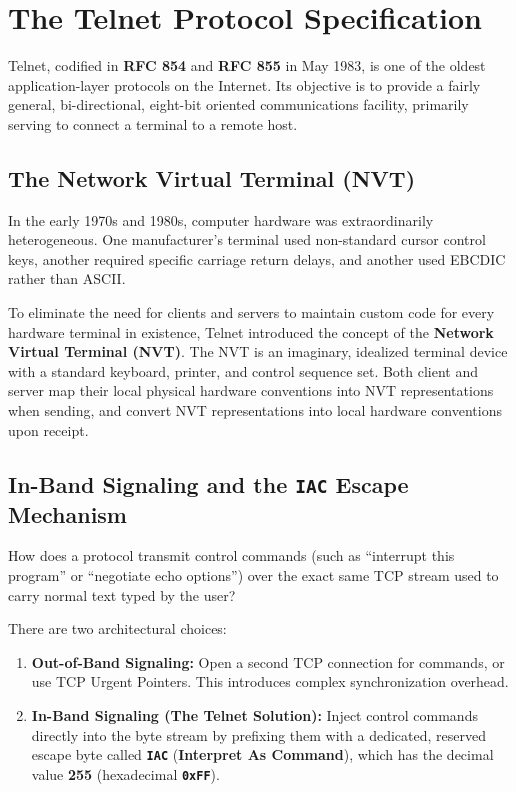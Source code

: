 \section{The Telnet Protocol Specification}

Telnet, codified in \textbf{RFC 854} and \textbf{RFC 855} in May 1983, is one of the oldest application-layer protocols on the Internet. Its objective is to provide a fairly general, bi-directional, eight-bit oriented communications facility, primarily serving to connect a terminal to a remote host.

\subsection{The Network Virtual Terminal (NVT)}

In the early 1970s and 1980s, computer hardware was extraordinarily heterogeneous. One manufacturer's terminal used non-standard cursor control keys, another required specific carriage return delays, and another used EBCDIC rather than ASCII.

To eliminate the need for clients and servers to maintain custom code for every hardware terminal in existence, Telnet introduced the concept of the \textbf{Network Virtual Terminal (NVT)}. The NVT is an imaginary, idealized terminal device with a standard keyboard, printer, and control sequence set. Both client and server map their local physical hardware conventions into NVT representations when sending, and convert NVT representations into local hardware conventions upon receipt.

\subsection{In-Band Signaling and the \texttt{IAC} Escape Mechanism}

How does a protocol transmit control commands (such as ``interrupt this program'' or ``negotiate echo options'') over the exact same TCP stream used to carry normal text typed by the user?

There are two architectural choices:
\begin{enumerate}[leftmargin=1.5em]
    \item \textbf{Out-of-Band Signaling:} Open a second TCP connection for commands, or use TCP Urgent Pointers. This introduces complex synchronization overhead.
    \item \textbf{In-Band Signaling (The Telnet Solution):} Inject control commands directly into the byte stream by prefixing them with a dedicated, reserved escape byte called \textbf{\texttt{IAC}} (\textbf{Interpret As Command}), which has the decimal value \textbf{255} (hexadecimal \textbf{\texttt{0xFF}}).
\end{enumerate}

